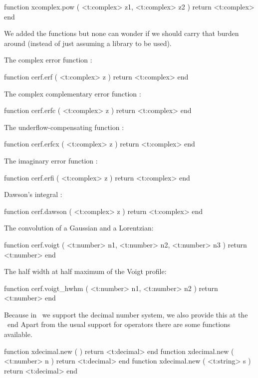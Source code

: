 function xcomplex.pow   ( <t:complex> z1, <t:complex> z2 ) return <t:complex> end
\stoptyping

We added the  functions but none can wonder if we should carry that
burden around (instead of just assuming a library to be used).

The complex error function :

\starttyping[option=LUA]
function cerf.erf ( <t:complex> z )
    return <t:complex>
end
\stoptyping

The complex complementary error function :

\starttyping[option=LUA]
function cerf.erfc ( <t:complex> z )
    return <t:complex>
end
\stoptyping

The underflow-compensating function :

\starttyping[option=LUA]
function cerf.erfcx ( <t:complex> z )
    return <t:complex>
end
\stoptyping

The imaginary error function :

\starttyping[option=LUA]
function cerf.erfi ( <t:complex> z )
    return <t:complex>
end
\stoptyping

Dawson's integral :

\starttyping[option=LUA]
function cerf.dawson ( <t:complex> z )
    return <t:complex>
end
\stoptyping

The convolution of a Gaussian and a Lorentzian:

\starttyping[option=LUA]
function cerf.voigt (
    <t:number> n1,
    <t:number> n2,
    <t:number> n3
)
    return <t:number>
end
\stoptyping

The half width at half maximum of the Voigt profile:

\starttyping[option=LUA]
function cerf.voigt_hwhm (
    <t:number> n1,
    <t:number> n2
)
    return <t:number>
end
\stoptyping

\stopsubsection

\startsubsection[title=Decimal numbers]

Because in \METAPOST\ we support the decimal number system, we also provide this
at the \TEX\ end Apart from the usual support for operators there are some
functions available.

\starttyping[option=LUA]
function xdecimal.new ( )              return <t:decimal> end
function xdecimal.new ( <t:number> n ) return <t:decimal> end
function xdecimal.new ( <t:string> s ) return <t:decimal> end
\stoptyping

